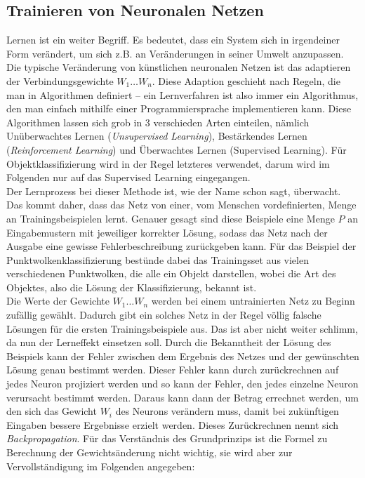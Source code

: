 \subsection{Trainieren von Neuronalen Netzen}
\label{sec:Training}

Lernen ist ein weiter Begriff. Es bedeutet, dass ein System sich in irgendeiner Form verändert, um sich z.B. an Veränderungen in seiner Umwelt anzupassen. Die typische Veränderung von künstlichen neuronalen Netzen ist das adaptieren der Verbindungsgewichte \(W_1 \dots W_n\). Diese Adaption geschieht nach Regeln, die man in Algorithmen definiert – ein Lernverfahren ist also immer ein Algorithmus, den man einfach mithilfe einer Programmiersprache implementieren kann. Diese Algorithmen lassen sich grob in 3 verschieden Arten einteilen, nämlich Unüberwachtes Lernen (\textit{Unsupervised Learning}), Bestärkendes Lernen (\textit{Reinforcement Learning}) und Überwachtes Lernen (Supervised Learning). Für Objektklassifizierung wird in der Regel letzteres verwendet, darum wird im Folgenden nur auf das Supervised Learning eingegangen.\\
 
Der Lernprozess bei dieser Methode ist, wie der Name schon sagt, überwacht. Das kommt daher, dass das Netz von einer, vom Menschen vordefinierten, Menge an Trainingsbeispielen lernt. Genauer gesagt sind diese Beispiele eine Menge \(P\) an Eingabemustern mit jeweiliger korrekter Lösung, sodass das Netz nach der Ausgabe eine gewisse Fehlerbeschreibung zurückgeben kann. Für das Beispiel der Punktwolkenklassifizierung bestünde dabei das Trainingsset aus vielen verschiedenen Punktwolken, die alle ein Objekt darstellen, wobei die Art des Objektes, also die Lösung der Klassifizierung, bekannt ist. \\

Die Werte der Gewichte \(W_1 \dots W_n\) werden bei einem untrainierten Netz zu Beginn zufällig gewählt. Dadurch gibt ein solches Netz in der Regel völlig falsche Lösungen für die ersten Trainingsbeispiele aus. Das ist aber nicht weiter schlimm, da nun der Lerneffekt einsetzen soll. Durch die Bekanntheit der Lösung des Beispiels kann der Fehler zwischen dem Ergebnis des Netzes und der gewünschten Lösung genau bestimmt werden. Dieser Fehler kann durch zurückrechnen auf jedes Neuron projiziert werden und so kann der Fehler, den jedes einzelne Neuron verursacht bestimmt werden. Daraus kann dann der Betrag errechnet werden, um den sich das Gewicht \(W_i\) des Neurons verändern muss, damit bei zukünftigen Eingaben bessere Ergebnisse erzielt werden. Dieses Zurückrechnen nennt sich \textit{Backpropagation}. Für das Verständnis des Grundprinzips ist die Formel zu Berechnung der Gewichtsänderung nicht wichtig, sie wird aber zur Vervollständigung im Folgenden angegeben: 

